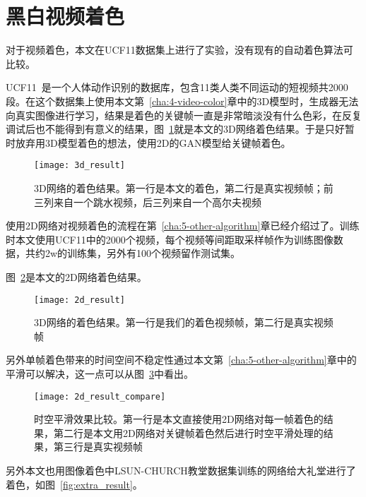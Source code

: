 \section{黑白视频着色}
\label{sec:6-video-color}

  对于视频着色，本文在UCF11数据集上进行了实验，没有现有的自动着色算法可比较。

  UCF11~\cite{DBLP:conf/cvpr/LiuLS09}是一个人体动作识别的数据库，包含11类人类不同运动的短视频共2000段。在这个数据集上使用本文第~\ref{cha:4-video-color}章中的3D模型时，生成器无法向真实图像进行学习，结果是着色的关键帧一直是非常暗淡没有什么色彩，在反复调试后也不能得到有意义的结果，图~\ref{fig:3d_result}就是本文的3D网络着色结果。于是只好暂时放弃用3D模型着色的想法，使用2D的GAN模型给关键帧着色。

  \begin{figure}[H]
    \centering
    \texttt{[image: 3d\_result]}
    \caption[3D网络着色结果]{3D网络的着色结果。第一行是本文的着色，第二行是真实视频帧；前三列来自一个跳水视频，后三列来自一个高尔夫视频}
    \label{fig:3d_result}
  \end{figure}

  使用2D网络对视频着色的流程在第~\ref{cha:5-other-algorithm}章已经介绍过了。训练时本文使用UCF11中的2000个视频，每个视频等间距取采样帧作为训练图像数据，共约2w的训练集，另外有100个视频留作测试集。

  图~\ref{fig:2d_result}是本文的2D网络着色结果。

  \begin{figure}[H]
    \centering
    \texttt{[image: 2d\_result]}
    \caption[2D网络着色结果]{3D网络的着色结果。第一行是我们的着色视频帧，第二行是真实视频帧}
    \label{fig:2d_result}
  \end{figure}

  另外单帧着色带来的时间空间不稳定性通过本文第~\ref{cha:5-other-algorithm}章中的平滑可以解决，这一点可以从图~\ref{fig:2d_result_compare}中看出。

  \begin{figure}[H]
    \centering
    \texttt{[image: 2d\_result\_compare]}
    \caption[时空平滑效果比较]{时空平滑效果比较。第一行是本文直接使用2D网络对每一帧着色的结果，第二行是本文用2D网络对关键帧着色然后进行时空平滑处理的结果，第三行是真实视频帧}
    \label{fig:2d_result_compare}
  \end{figure}

  另外本文也用图像着色中LSUN-CHURCH教堂数据集训练的网络给大礼堂进行了着色，如图~\ref{fig:extra_result}。

